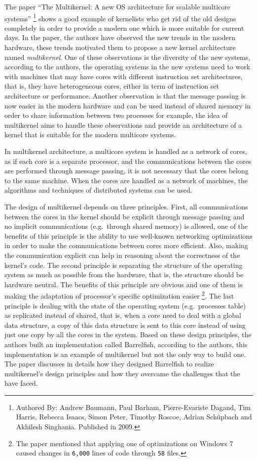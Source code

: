 The paper ``The Multikernel: A new OS architecture for scalable
multicore systems'' \footnote{Authored By: Andrew Baumann, Paul Barham,
  Pierre-Evariste Dagand, Tim Harris, Rebecca Isaacs, Simon Peter,
  Timothy Roscoe, Adrian Schüpbach and Akhilesh Singhania. Published in
  2009.} shows a good example of kernelists who get rid of the old
designs completely in order to provide a modern one which is more
suitable for current days. In the paper, the authors have observed the
new trends in the modern hardware, these trends motivated them to
propose a new kernel architecture named \emph{multikernel}. One of these
observations is the diversity of the new systems, according to the
authors, the operating systems in the new systems need to work with
machines that may have cores with different instruction set
architectures, that is, they have heterogeneous cores, either in term of
instruction set architecture or performance. Another observation is that
the message passing is now easier in the modern hardware and can be used
instead of shared memory in order to share information between two
processes for example, the idea of multikernel aims to handle these
observations and provide an architecture of a kernel that is suitable
for the modern multicore systems.

In multikernel architecture, a multicore system is handled as a network
of cores, as if each core is a separate processor, and the
communications between the cores are performed through message passing,
it is not necessary that the cores belong to the same machine. When the
cores are handled as a network of machines, the algorithms and
techniques of distributed systems can be used.

The design of multikernel depends on three principles. First, all
communications between the cores in the kernel should be explicit
through message passing and no implicit communications (e.g.~through
shared memory) is allowed, one of the benefits of this principle is the
ability to use well-known networking optimizations in order to make the
communications between cores more efficient. Also, making the
communication explicit can help in reasoning about the correctness of
the kernel's code. The second principle is separating the structure of
the operating system as much as possible from the hardware, that is, the
structure should be hardware neutral. The benefits of this principle are
obvious and one of them is making the adaptation of processor's specific
optimization easier \footnote{The paper mentioned that applying one of
  optimizations on Windows 7 caused changes in \lstinline!6,000! lines
  of code through \lstinline!58! files.}. The last principle is dealing
with the state of the operating system (e.g.~processes table) as
replicated instead of shared, that is, when a core need to deal with a
global data structure, a copy of this data structure is sent to this
core instead of using just one copy by all the cores in the system.
Based on these design principles, the authors built an implementation
called Barrelfish, according to the authors, this implementation is an
example of multikernel but not the only way to build one. The paper
discusses in details how they designed Barrelfish to realize
multikernel's design principles and how they overcame the challenges
that the have faced.


